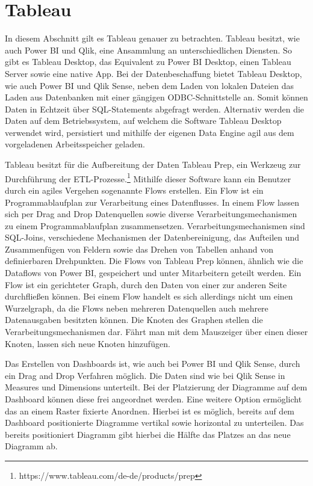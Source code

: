 \section{Tableau}
\label{sec:tableau}
In diesem Abschnitt gilt es Tableau genauer zu betrachten. Tableau besitzt, wie auch Power BI und Qlik,
eine Ansammlung an unterschiedlichen Diensten. So gibt es Tableau Desktop, das Equivalent zu Power BI
Desktop, einen Tableau Server sowie eine native App. Bei der Datenbeschaffung bietet Tableau Desktop, wie auch
Power BI und Qlik Sense, neben dem Laden von lokalen Dateien das Laden aus Datenbanken
mit einer gängigen ODBC-Schnittstelle an. Somit können Daten in Echtzeit
über SQL-Statements abgefragt werden. Alternativ werden die Daten auf dem Betriebssystem, auf welchem die Software
Tableau Desktop verwendet wird, persistiert und mithilfe der eigenen Data Engine agil aus dem
vorgeladenen Arbeitsspeicher geladen.\cite[S. 50]{ProTableauBook}

Tableau besitzt für die Aufbereitung der Daten Tableau Prep, ein Werkzeug zur Durchführung der
ETL-Prozesse.\footnote{https://www.tableau.com/de-de/products/prep} Mithilfe dieser Software kann ein Benutzer
durch ein agiles Vergehen sogenannte Flows erstellen. Ein Flow ist ein Programmablaufplan
zur Verarbeitung eines Datenflusses. In einem Flow lassen sich per Drag and Drop
Datenquellen sowie diverse Verarbeitungsmechanismen zu einem Programmablaufplan
zusammensetzen. Verarbeitungsmechanismen sind SQL-Joins, verschiedene Mechanismen der Datenbereinigung,
das Aufteilen und Zusammenfügen von Feldern sowie das Drehen von Tabellen anhand
von definierbaren Drehpunkten.\cite{PrepareYourDataForTableauBook} Die Flows von Tableau Prep können,
ähnlich wie die Dataflows von Power BI, gespeichert und unter Mitarbeitern geteilt werden. Ein Flow ist ein gerichteter Graph,
durch den Daten von einer zur anderen Seite durchfließen können. Bei einem Flow handelt es sich allerdings nicht um einen Wurzelgraph,
da die Flows neben mehreren Datenquellen auch mehrere Datenausgaben besitzten können. Die Knoten des Graphen
stellen die Verarbeitungsmechanismen dar. Fährt man mit dem Mauszeiger über einen dieser
Knoten, lassen sich neue Knoten hinzufügen.

Das Erstellen von Dashboards ist, wie auch bei Power BI und Qlik Sense, durch ein Drag and Drop Verfahren möglich.
Die Daten sind wie bei Qlik Sense in Measures und Dimensions unterteilt. Bei der Platzierung der Diagramme auf dem
Dashboard können diese frei angeordnet werden. Eine weitere Option ermöglicht das an einem Raster fixierte Anordnen.
Hierbei ist es möglich, bereits auf dem Dashboard positionierte Diagramme vertikal sowie horizontal zu unterteilen.
Das bereits positioniert Diagramm gibt hierbei die Hälfte das Platzes an das neue Diagramm ab.
